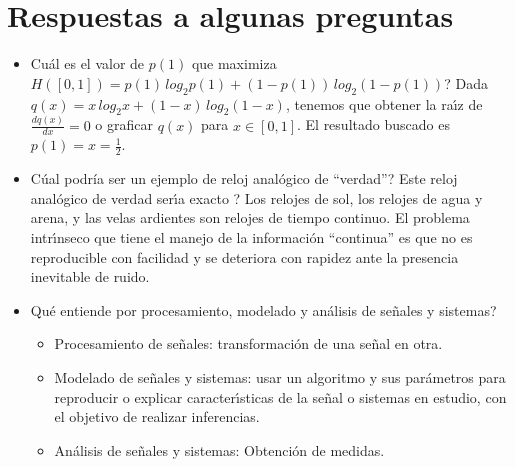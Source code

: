 \section{Respuestas a algunas preguntas}

\begin{itemize}
\item \textquestiondown Cu\'{a}l es el valor de $p(1)$ que maximiza
  $H([0,1]) = p(1) \, log_{2} p(1) + (1 - p(1)) \, log_{2} (1 - p(1))$?
Dada $q(x) = x \, log_{2} x + (1 - x) \, log_{2} (1 - x)$, tenemos que obtener la ra\'{\i}z de 
$\frac{d q(x)}{d x} = 0$ o graficar $q(x)$ para $x \in [0, 1]$.
El resultado buscado es $p(1) = x = \frac{1}{2}$.

\item \textquestiondown C\'{u}al podr\'{i}a ser un ejemplo de reloj
  anal\'{o}gico de ``verdad''?  \textquestiondown Este reloj
  anal\'{o}gico de verdad ser\'{\i}a exacto ?
Los relojes de sol, los relojes de agua y arena, y las velas ardientes son relojes de tiempo continuo.
El problema intr\'{\i}nseco que tiene el manejo de la informaci\'{o}n ``continua'' es que no es reproducible con facilidad y se deteriora con rapidez ante la presencia inevitable de ruido.

\item \textquestiondown Qu\'{e} entiende por procesamiento, modelado y an\'{a}lisis de se\~{n}ales y sistemas?
\begin{itemize}
\item Procesamiento de se\~{n}ales: transformaci\'{o}n de una se\~{n}al en otra.

\item Modelado de se\~{n}ales y sistemas: usar un algoritmo y sus par\'{a}metros 
para reproducir o explicar caracter\'{\i}sticas de la se\~{n}al o sistemas en estudio, 
con el objetivo de realizar inferencias.

\item An\'{a}lisis de se\~{n}ales y sistemas: Obtenci\'{o}n de medidas.
\end{itemize}

\end{itemize}



